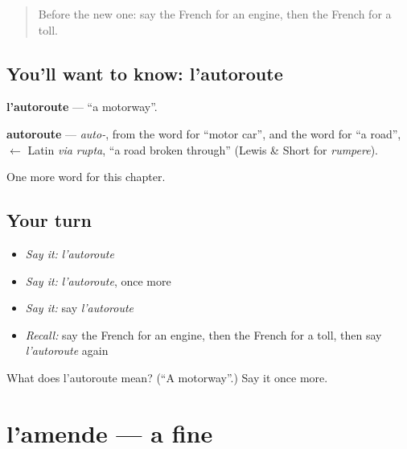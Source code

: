 \label{lesson:FR-C227-autoroute}



\begin{quote}
Before the new one: say the French for an engine, then the French for a toll.
\end{quote}

\subsection*{You'll want to know: l'autoroute}
\textbf{l'autoroute} — \textquotedblleft{}a motorway\textquotedblright{}.

\begin{cousinweb}
\textbf{autoroute} — \emph{auto-}, from the word for \textquotedblleft{}motor car\textquotedblright{}, and the word for \textquotedblleft{}a road\textquotedblright{}, $\leftarrow$ Latin \emph{via rupta}, \textquotedblleft{}a road broken through\textquotedblright{} (Lewis \& Short for \emph{rumpere}).
\end{cousinweb}

\begin{grammarlens}[title={What you've built}]
One more word for this chapter.
\end{grammarlens}

\subsection*{Your turn}
\begin{itemize}
\raggedright
  \item \emph{Say it:} \emph{l'autoroute}
  \item \emph{Say it:} \emph{l'autoroute}, once more
  \item \emph{Say it:} say \emph{l'autoroute}
  \item \emph{Recall:} say the French for an engine, then the French for a toll, then say \emph{l'autoroute} again
\end{itemize}

\begin{tcolorbox}[breakable,colback=teal!4,colframe=teal!35!black,title={Before you move on}]
What does l'autoroute mean? (\textquotedblleft{}A motorway\textquotedblright{}.) Say it once more.
\end{tcolorbox}
\section[l'amende]{l'amende — a fine}


